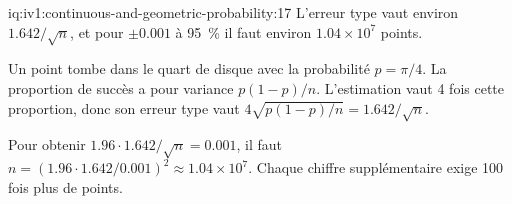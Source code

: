 \begin{solution}{iq:iv1:continuous-and-geometric-probability:17}
L'erreur type vaut environ $1.642/\sqrt{n}$, et pour $\pm 0.001$ à 95~\% il faut environ $1.04 \times 10^7$ points.

Un point tombe dans le quart de disque avec la probabilité $p = \pi/4$. La proportion de succès a pour variance $p(1 - p)/n$. L'estimation vaut 4 fois cette proportion, donc son erreur type vaut $4\sqrt{p(1 - p)/n} = 1.642/\sqrt{n}$.

Pour obtenir $1.96 \cdot 1.642/\sqrt{n} = 0.001$, il faut $n = (1.96 \cdot 1.642/0.001)^2 \approx 1.04 \times 10^7$. Chaque chiffre supplémentaire exige 100 fois plus de points.

\end{solution}

